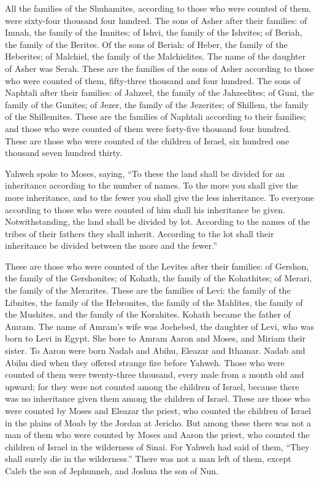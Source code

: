 {All the families of the Shuhamites, according to those who were counted of them, were sixty-four thousand four hundred.
The sons of Asher after their families: of Imnah, the family of the Imnites; of Ishvi, the family of the Ishvites; of Beriah, the family of the Berites.
Of the sons of Beriah: of Heber, the family of the Heberites; of Malchiel, the family of the Malchielites.
The name of the daughter of Asher was Serah.
These are the families of the sons of Asher according to those who were counted of them, fifty-three thousand and four hundred.
The sons of Naphtali after their families: of Jahzeel, the family of the Jahzeelites; of Guni, the family of the Gunites;
of Jezer, the family of the Jezerites; of Shillem, the family of the Shillemites.
These are the families of Naphtali according to their families; and those who were counted of them were forty-five thousand four hundred.
These are those who were counted of the children of Israel, six hundred one thousand seven hundred thirty.
\par }{\PP {}Yahweh spoke to Moses, saying,
“To these the land shall be divided for an inheritance according to the number of names.
To the more you shall give the more inheritance, and to the fewer you shall give the less inheritance. To everyone according to those who were counted of him shall his inheritance be given.
Notwithstanding, the land shall be divided by lot. According to the names of the tribes of their fathers they shall inherit.
According to the lot shall their inheritance be divided between the more and the fewer.”
\par }{\PP {}These are those who were counted of the Levites after their families: of Gershon, the family of the Gershonites; of Kohath, the family of the Kohathites; of Merari, the family of the Merarites.
These are the families of Levi: the family of the Libnites, the family of the Hebronites, the family of the Mahlites, the family of the Mushites, and the family of the Korahites. Kohath became the father of Amram.
The name of Amram’s wife was Jochebed, the daughter of Levi, who was born to Levi in Egypt. She bore to Amram Aaron and Moses, and Miriam their sister.
To Aaron were born Nadab and Abihu, Eleazar and Ithamar.
Nadab and Abihu died when they offered strange fire before Yahweh.
Those who were counted of them were twenty-three thousand, every male from a month old and upward; for they were not counted among the children of Israel, because there was no inheritance given them among the children of Israel.
These are those who were counted by Moses and Eleazar the priest, who counted the children of Israel in the plains of Moab by the Jordan at Jericho.
But among these there was not a man of them who were counted by Moses and Aaron the priest, who counted the children of Israel in the wilderness of Sinai.
For Yahweh had said of them, “They shall surely die in the wilderness.” There was not a man left of them, except Caleb the son of Jephunneh, and Joshua the son of Nun.

}
